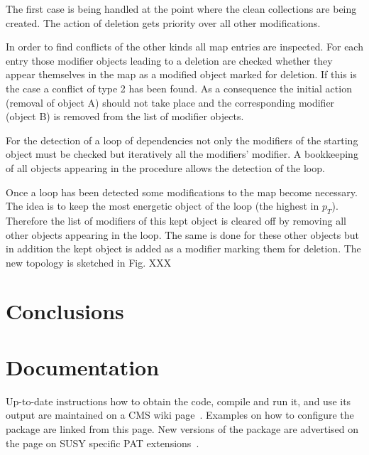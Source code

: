 \documentclass{cmspaper}
\begin{document}

The first case is being handled at the point where the clean collections are
being created. The action of deletion gets priority over all other
modifications.

In order to find conflicts of the other kinds all map entries are inspected. For
each entry those modifier objects leading to a deletion are checked whether they
appear themselves in the map as a modified object marked for deletion. If this
is the case a conflict of type 2 has been found. As a consequence the initial
action (removal of object A)  should not take place and the corresponding
modifier (object B) is removed from the list of modifier objects.

For the detection of a loop of dependencies not only the modifiers of the
starting object must be checked but iteratively all the modifiers' modifier. A
bookkeeping of all objects appearing in the procedure allows the detection of
the loop.

Once a loop has been detected some modifications to the map become necessary.
The idea is to keep the most energetic object of the loop (the highest in
$p_T$). Therefore the list of modifiers of this kept object is cleared off by
removing all other objects appearing in the loop. %
The same is done for these other objects but in addition the kept object is
added as a modifier marking them for deletion. The new topology is sketched in
Fig. XXX %

\section{Conclusions}


\section{Documentation}
Up-to-date instructions how to obtain the code, compile and run it, and use its
output are maintained on a CMS wiki page~\cite{twiki}. Examples on how to
configure the package are linked from this page. New versions of the package are
advertised on the page on SUSY specific PAT extensions~\cite{susypat}.


\end{document}
